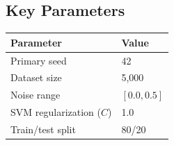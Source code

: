 \documentclass[11pt,a4paper]{article}
\begin{document}
\subsection{Key Parameters}

\begin{table}[h]
\centering
\begin{tabular}{ll}
\toprule
\textbf{Parameter} & \textbf{Value} \\
\midrule
Primary seed & 42 \\
Dataset size & 5,000 \\
Noise range & $[0.0, 0.5]$ \\
SVM regularization ($C$) & 1.0 \\
Train/test split & 80/20 \\
\bottomrule
\end{tabular}
\end{table}
\end{document}
